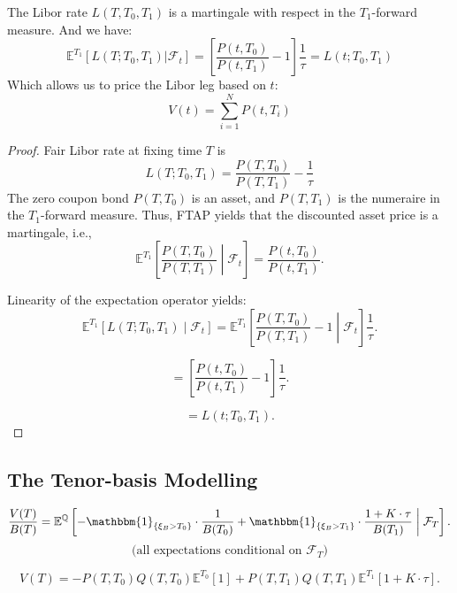 \begin{theorem}
	The Libor rate $L(T, T_0, T_1)$ is a martingale with respect in the $T_1$-forward measure. And we have:
	\begin{equation*}
		\mathbb{E}^{T_1} [L(T;T_0, T_1)|\mathcal{F}_t] = \left[\frac{P(t, T_0)}{P(t, T_1)} - 1\right] \frac{1}{\tau} = L(t; T_0, T_1)
	\end{equation*}
	Which allows us to price the Libor leg based on $t$:
	\begin{equation*}
		V(t) = \sum^N_{i = 1} P(t, T_i) 
	\end{equation*}
\end{theorem}
\begin{proof}
Fair Libor rate at fixing time $T$ is
\[
L(T; T_0, T_1) = \frac{P(T, T_0)}{P(T, T_1)} - \frac{1}{\tau}
\]
The zero coupon bond $P(T, T_0)$ is an asset, and $P(T, T_1)$ is the numeraire in the $T_1$-forward measure. Thus, FTAP yields that the discounted asset price is a martingale, i.e.,
\[
\mathbb{E}^{T_1} \left[\frac{P(T, T_0)}{P(T, T_1)} \middle| \mathcal{F}_t \right] = \frac{P(t, T_0)}{P(t, T_1)}.
\]

Linearity of the expectation operator yields:
\[
\mathbb{E}^{T_1} \left[L(T; T_0, T_1) \middle| \mathcal{F}_t \right] = \mathbb{E}^{T_1} \left[\frac{P(T, T_0)}{P(T, T_1)} - 1 \middle| \mathcal{F}_t \right] \frac{1}{\tau}.
\]

\[
= \left[\frac{P(t, T_0)}{P(t, T_1)} - 1\right] \frac{1}{\tau}.
\]

\[
= L(t; T_0, T_1).
\]
\end{proof}




\subsection{The Tenor-basis Modelling}


\[
\frac{V(T)}{B(T)} = \mathbb{E}^{\mathbb{Q}} \left[
-\mathbbm{1}_{\{\xi_B > T_0\}} \cdot \frac{1}{B(T_0)} 
+ \mathbbm{1}_{\{\xi_B > T_1\}} \cdot \frac{1 + K \cdot \tau}{B(T_1)}
\;\middle|\; \mathcal{F}_T \right].
\]
\[
\text{(all expectations conditional on } \mathcal{F}_T \text{)}
\]

\[
V(T) = -P(T, T_0) Q(T, T_0) \mathbb{E}^{T_0}[1] 
+ P(T, T_1) Q(T, T_1) \mathbb{E}^{T_1}[1 + K \cdot \tau].
\]

